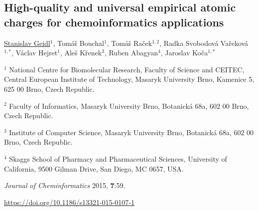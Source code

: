 
\begin{center}
\section{High-quality and universal empirical atomic
charges for chemoinformatics applications}

\underline{Stanislav Geidl}$^1$, Tomáš Bouchal$^1$, Tomáš Raček$^{1,2}$,
Radka Svobodová Vařeková$^{1, *}$, Václav Hejret$^1$, Aleš Křenek$^3$,
Ruben Abagyan$^4$, Jaroslav Koča$^{1, *}$

\vspace{1cm}

$^1$ National Centre for Biomolecular Research, Faculty of Science and CEITEC,
Central European Institute of Technology, Masaryk University Brno, Kamenice 5,
625 00 Brno, Czech Republic.

$^2$ Faculty of Informatics, Masaryk University Brno, Botanická 68a, 602 00 Brno,
Czech Republic.

$^3$ Institute of Computer Science, Masaryk University Brno, Botanická 68a,
602 00 Brno, Czech Republic.

$^4$ Skaggs School of Pharmacy and Pharmaceutical Sciences, University of
California, 9500 Gilman Drive, San Diego, MC 0657, USA.

\vspace{1cm}

\textit{Journal of Cheminformatics} 2015, \textbf{7}:59.

\vspace{1cm}

\url{https://doi.org/10.1186/s13321-015-0107-1}

\end{center}




